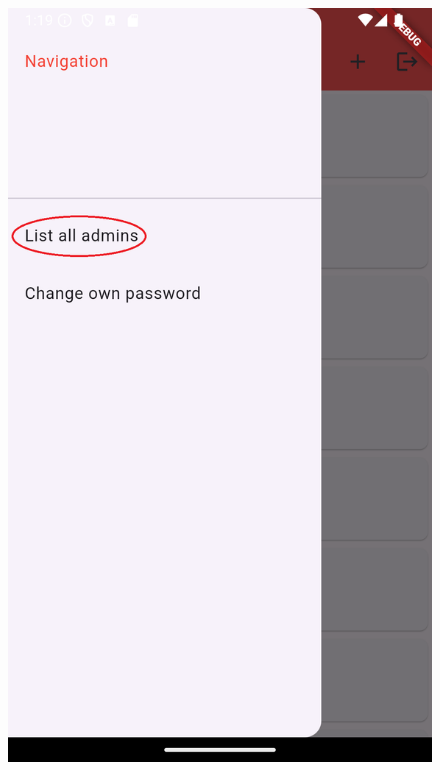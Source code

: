 \documentclass[a4paper,12pt,twoside]{ThesisStyle}
\begin{document}
\begin{figure}[h]
\begin{minipage}{0.31\textwidth}
        \includegraphics[width=\linewidth]{imatges/adminNavigation1.png}

\end{minipage}
\end{figure}
\end{document}
